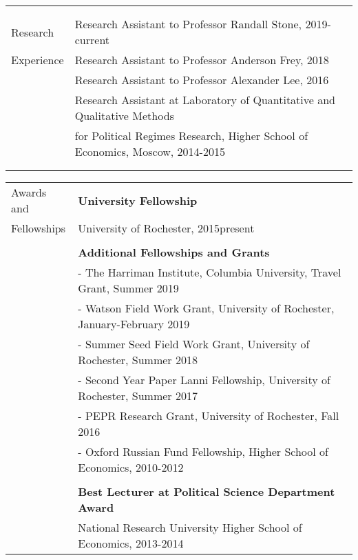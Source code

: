 \documentclass[letterpaper,11pt,oneside]{article}
\begin{document}
\begin{tabular}{@{} l l}
&\\
&\\
 \Large{Research} & Research Assistant to Professor Randall Stone, 2019-current\\
 \Large{Experience}&Research Assistant to Professor Anderson Frey, 2018\\
 & Research Assistant to Professor Alexander Lee, 2016\\
 & Research Assistant at Laboratory of Quantitative and Qualitative Methods \\
 &for Political Regimes Research, Higher School of Economics, Moscow, 2014-2015 \\
 &\\
 & \\
        \end{tabular}
 
\noindent \begin{tabular}{@{} l l} 
	\Large{Awards and }    
	& \textbf{University Fellowship
	} \\
	\Large{Fellowships}   & University of Rochester, 2015\textendash present  \\
	& \\
         & \textbf{Additional Fellowships and Grants} \\
           & - The Harriman Institute, Columbia University, Travel Grant, Summer 2019 \\
               & - Watson Field Work Grant, University of Rochester, January-February 2019 \\
          &-  Summer Seed Field Work Grant, University of Rochester, Summer 2018  \\
     & - Second Year Paper Lanni Fellowship, University of Rochester, Summer 2017\\
      &-  PEPR Research Grant, University of Rochester, Fall 2016 \\
         & - Oxford Russian Fund Fellowship, Higher School of Economics, 2010-2012 \\
& \\
           & \textbf{Best Lecturer at Political Science Department Award} \\
          & National Research University Higher School of Economics, 2013-2014 \\


\end{tabular}
\end{document}
